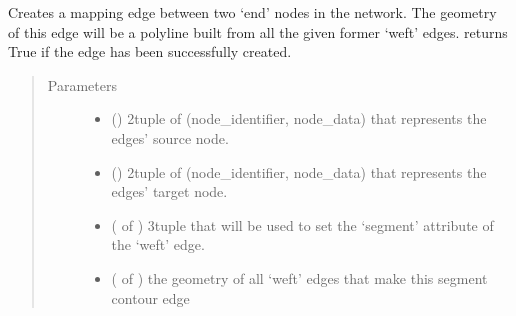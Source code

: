\documentclass[letterpaper,10pt,english]{sphinxmanual}
\begin{document}
\begin{fulllineitems}

\begin{fulllineitems}
\label{\detokenize{cockatoo:cockatoo.KnitNetworkBase.create_segment_contour_edge}}
Creates a mapping edge between two ‘end’ nodes in the network. The
geometry of this edge will be a polyline built from all the given
former ‘weft’ edges. returns True if the edge has been successfully
created.
\begin{quote}\begin{description}
\item[{Parameters}] \leavevmode\begin{itemize}
\item {} 
 () \textendash{} 2\sphinxhyphen{}tuple of (node\_identifier, node\_data) that represents the edges’
source node.

\item {} 
 () \textendash{} 2\sphinxhyphen{}tuple of (node\_identifier, node\_data) that represents the edges’
target node.

\item {} 
 ( of ) \textendash{} 3\sphinxhyphen{}tuple that will be used to set the ‘segment’ attribute of the
‘weft’ edge.

\item {} 
 ( of ) \textendash{} the geometry of all ‘weft’ edges that make this segment contour edge

\end{itemize}


\end{description}
\end{quote}
\end{fulllineitems}
\end{fulllineitems}
\end{document}
